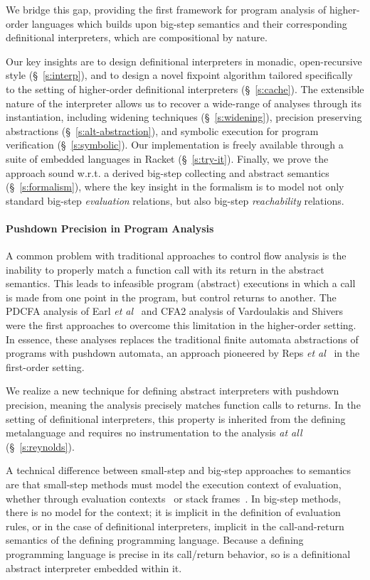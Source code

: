 We bridge this gap, providing the first framework for program analysis of
higher-order languages which builds upon big-step semantics and their
corresponding definitional interpreters, which are compositional by nature. 

Our key insights are to design definitional interpreters in monadic,
open-recursive style (§~\ref{s:interp}), and to design a
novel fixpoint algorithm tailored specifically to the setting of higher-order
definitional interpreters (§~\ref{s:cache}). The extensible nature of the
interpreter allows us to recover a wide-range of analyses through its
instantiation, including widening techniques (§~\ref{s:widening}), precision
preserving abstractions (§~\ref{s:alt-abstraction}), and symbolic execution for
program verification (§~\ref{s:symbolic}). Our implementation is freely
available through a suite of embedded languages in Racket (§~\ref{s:try-it}).
Finally, we prove the approach sound w.r.t. a derived big-step collecting and
abstract semantics (§~\ref{s:formalism}), where the key insight in the
formalism is to model not only standard big-step \emph{evaluation} relations,
but also big-step \emph{reachability} relations.

\paragraph{Pushdown Precision in Program Analysis}
A common problem with traditional approaches to control flow analysis is the
inability to properly match a function call with its return in the abstract
semantics. This leads to infeasible program (abstract) executions in which a
call is made from one point in the program, but control returns to another.
The PDCFA analysis of Earl \emph{et al}~\cite{dvanhorn:Earl2010Pushdown} and
CFA2 analysis of Vardoulakis and Shivers~\cite{dvanhorn:Vardoulakis2011CFA2}
were the first approaches to overcome this limitation in the higher-order
setting. In essence, these analyses replaces the traditional finite automata
abstractions of programs with pushdown automata, an approach pioneered by Reps
\emph{et al}~\cite{dvanhorn:Reps1995Precise} in the first-order setting.

We realize a new technique for defining abstract interpreters with pushdown
precision, meaning the analysis precisely matches function calls to returns. In
the setting of definitional interpreters, this property is inherited from the
defining metalanguage and requires no instrumentation to the analysis \emph{at
all} (§~\ref{s:reynolds}).

A technical difference between small-step and big-step approaches to semantics
are that small-step methods must model the execution context of evaluation,
whether through evaluation contexts~\cite{local:felleisen-TCS1992} or stack
frames~\cite{dvanhorn:Felleisen1987Calculus}. In big-step methods, there is no
model for the context; it is implicit in the definition of evaluation rules, or
in the case of definitional interpreters, implicit in the call-and-return
semantics of the defining programming language. Because a defining programming
language is precise in its call/return behavior, so is a definitional abstract
interpreter embedded within it.
